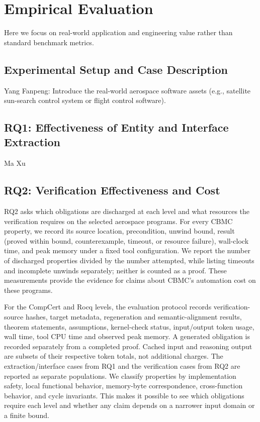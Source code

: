 \documentclass[manuscript, screen, review]{acmart}
\begin{document}
\section{Empirical Evaluation}


Here we focus on real-world application and engineering value rather than standard benchmark metrics. 
\subsection{Experimental Setup and Case Description}

Yang Fanpeng: Introduce the real-world aerospace software assets (e.g., satellite sun-search control system or flight control software).
\subsection{RQ1: Effectiveness of Entity and Interface Extraction}


Ma Xu 
\subsection{RQ2: Verification Effectiveness and Cost}

RQ2 asks which obligations are discharged at each level and what resources
the verification requires on the selected aerospace programs. For every
CBMC property, we record its source location, precondition, unwind bound,
result (proved within bound, counterexample, timeout, or resource failure),
wall-clock time, and peak memory under a fixed tool configuration. We report
the number of discharged properties divided by the number attempted, while
listing timeouts and incomplete unwinds separately; neither is counted as a
proof. These measurements provide the evidence for claims about CBMC's
automation cost on these programs.

For the CompCert and Rocq levels, the evaluation protocol records verification-source hashes,
target metadata, regeneration and semantic-alignment results, theorem
statements, assumptions, kernel-check status, input/output token usage,
wall time, tool CPU time and observed peak memory. A generated obligation
is recorded separately from a completed proof. Cached input and reasoning
output are subsets of their respective token totals, not additional charges.
The extraction/interface cases from RQ1 and the verification cases from RQ2
are reported as separate populations.
We classify properties by implementation safety, local functional behavior,
memory-byte correspondence, cross-function behavior, and cycle invariants.
This makes it possible to see which obligations require each level and
whether any claim depends on a narrower input domain or a finite bound.
\end{document}
